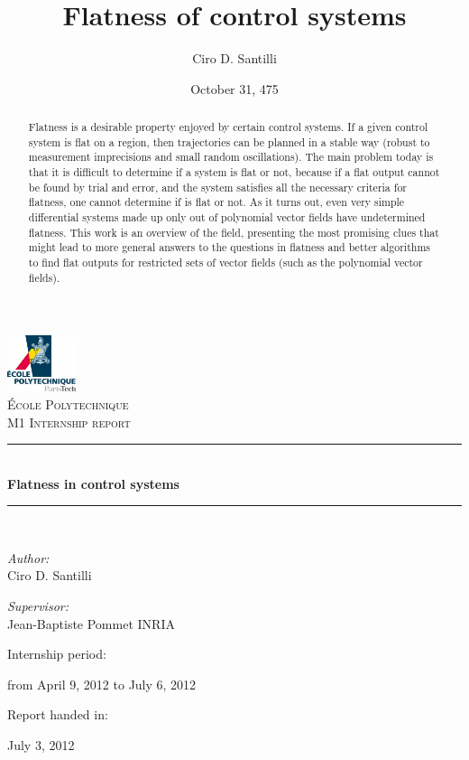 \documentclass[12pt]{article}
\title{Flatness of control systems}
\date{October 31, 475}
\author{Ciro D. Santilli}
\newcommand{\HRule}{\rule{\linewidth}{0.5mm}}
\begin{document}
\begin{titlepage}
\begin{center}
\includegraphics[width=0.15\textwidth]{ecole_polytechnique_paristech_logo}\\[1cm]
\textsc{\LARGE École Polytechnique}\\[1.5cm]
\textsc{\Large M1 Internship report}\\[0.5cm]
\HRule \\[0.4cm]
{ \huge \bfseries Flatness in control systems}\\[0.4cm]
\HRule \\[1.5cm]
\begin{minipage}{0.4\textwidth}
\begin{flushleft} \large
\emph{Author:}\\
Ciro D. Santilli
\end{flushleft}
\end{minipage}
\begin{minipage}{0.4\textwidth}
\begin{flushright} \large
\emph{Supervisor:} \\
Jean-Baptiste Pommet
INRIA
\end{flushright}
\end{minipage}
\vfill
{\large Internship period:

from April 9, 2012 to July 6, 2012

\vspace{10 mm}

Report handed in:

July 3, 2012 }

\end{center}

\end{titlepage}

\begin{abstract} Flatness is a desirable property enjoyed by certain control systems.
  If a given control system is flat on a region, then trajectories can be planned in
  a stable way (robust to measurement imprecisions and small random oscillations).
  The main problem today is that it is difficult to determine if a system is flat or
  not, because if a flat output cannot be found by trial and error, and the system
  satisfies all the necessary criteria for flatness, one cannot determine if is flat
  or not. As it turns out, even very simple differential systems made up only out of
  polynomial vector fields have undetermined flatness. This work is an overview
  of the field, presenting the most promising clues that might lead to more general
  answers to the questions in flatness and better algorithms to find flat outputs
  for restricted sets of vector fields (such as the polynomial vector fields).
\end{abstract}
\end{document}
